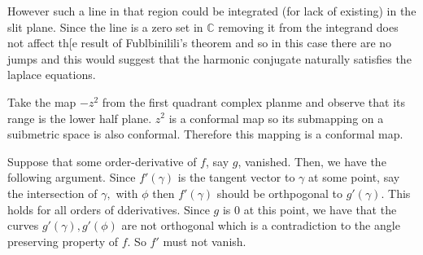 \documentclass[letter]{article}
\newenvironment{menumerate}{%
  \edef\backupindent{\the\parindent}%
  \enumerate%
  \setlength{\parindent}{\backupindent}%
}{\endenumerate}
\begin{document}
\begin{menumerate}
However such a line in that region could be integrated (for lack of existing) in the slit plane. Since the line is a zero set 
in $\mathbb{C}$ removing it from the integrand does not affect th[e result of Fublbinilili's theorem and so in this case there are
no jumps and this would suggest that the harmonic conjugate naturally satisfies the laplace equations. 

\item
\item Take the map $-z^2$ from the first quadrant complex planme and observe that its range is the lower half plane. $z^2$ is
a conformal map so its submapping on a suibmetric space is also conformal. Therefore this mapping is a conformal map.
\item Suppose that some order-derivative of $f$, say $g$, vanished. Then, we have the following argument. 
Since $f'(\gamma)$ is the tangent vector to $\gamma$ at some point, say the intersection of $\gamma,$ with $\phi$
then $f'(\gamma)$ should be orthpogonal to $g'(\gamma).$ This holds for all orders of dderivatives. Since $g$ is
$0$ at this point, we have that the curves $g'(\gamma), g'(\phi)$ are not orthogonal which is a contradiction
to the angle preserving property of $f.$ So $f'$ must not vanish.
\end{menumerate}    
\end{document}
